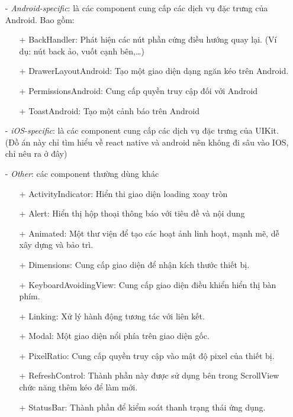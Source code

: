 \begin{enumerate}
\begin{enumerate}
\begin{enumerate}
        \end{enumerate}
        \item[-] {\textit{Android-specific}}: là các component cung cấp các dịch vụ đặc trưng của Android. Bao gồm:
        \begin{enumerate}
            \item[+] BackHandler: Phát hiện các nút phần cứng điều hướng quay lại. (Ví dụ: nút back ảo, vuốt cạnh bên,\dots)
            \item[+] DrawerLayoutAndroid: Tạo một giao diện dạng ngăn kéo trên Android.
            \item[+] PermissionsAndroid: Cung cấp quyền truy cập đối với Android
            \item[+] ToastAndroid: Tạo một cảnh báo trên Android
        \end{enumerate}
        \item[-] {\textit{iOS-specific}}: là các component cung cấp các dịch vụ đặc trưng của UIKit. (Đồ án này chỉ tìm hiểu về react native và android nên không đi sâu vào IOS, chỉ nêu ra ở đây) 
        \item[-] {\textit{Other}}: các component thường dùng khác
        \begin{enumerate}
            \item[+] ActivityIndicator: Hiển thi giao diện loading xoay tròn
            \item[+] Alert: Hiển thị hộp thoại thông báo với tiêu đề và nội dung
            \item[+] Animated: Một thư viện để tạo các hoạt ảnh linh hoạt, mạnh mẽ, dễ xây dựng và bảo trì.
            \item[+] Dimensions: Cung cấp giao diện để nhận kích thước thiết bị.
            \item[+] KeyboardAvoidingView: Cung cấp giao diện điều khiển hiển thị bàn phím.
            \item[+] Linking: Xử lý hành động tương tác với liên kết.
            \item[+] Modal: Một giao diện nổi phía trên giao diện gốc.
            \item[+] PixelRatio: Cung cấp quyền truy cập vào mật độ pixel của thiết bị.
            \item[+] RefreshControl: Thành phần này được sử dụng bên trong ScrollView chức năng thêm kéo để làm mới.
            \item[+] StatusBar: Thành phần để kiểm soát thanh trạng thái ứng dụng.
        \end{enumerate}

\end{enumerate}
\end{enumerate}

